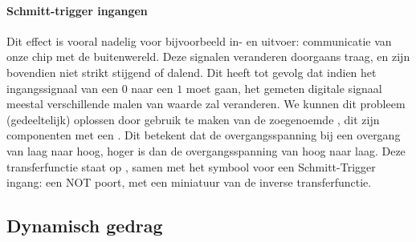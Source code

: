\paragraph{Schmitt-trigger ingangen}
Dit effect is vooral nadelig voor bijvoorbeeld in- en uitvoer: communicatie van onze chip met de buitenwereld. Deze signalen veranderen doorgaans traag, en zijn bovendien niet strikt stijgend of dalend. Dit heeft tot gevolg dat indien het ingangssignaal van een $0$ naar een $1$ moet gaan, het gemeten digitale signaal meestal verschillende malen van waarde zal veranderen. We kunnen dit probleem (gedeeltelijk) oplossen door gebruik te maken van de zoegenoemde , dit zijn componenten met een . Dit betekent dat de overgangsspanning bij een overgang van laag naar hoog, hoger is dan de overgangsspanning van hoog naar laag. Deze transferfunctie staat op , samen met het symbool voor een Schmitt-Trigger ingang: een NOT poort, met een miniatuur van de inverse transferfunctie.

\subsection{Dynamisch gedrag}

